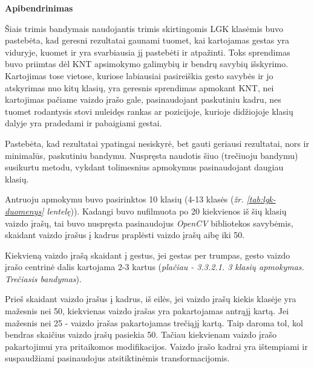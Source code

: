 \documentclass{VUMIFPSbakalaurinis}
\begin{document}
\bigbreak
\textbf{Apibendrinimas}

Šiais trimis bandymais naudojantis trimis skirtingomis LGK klasėmis buvo pastebėta, kad geresni rezultatai gaunami tuomet, kai kartojamas gestas yra viduryje, kuomet ir yra svarbiausia jį pastebėti ir atpažinti. Toks sprendimas buvo priimtas dėl KNT apsimokymo galimybių ir bendrų savybių išskyrimo. Kartojimas tose vietose, kuriose labiausiai pasireiškia gesto savybės ir jo atskyrimas nuo kitų klasių, yra geresnis sprendimas apmokant KNT, nei kartojimas pačiame vaizdo įrašo gale, pasinaudojant paskutiniu kadru, nes tuomet rodantysis stovi nuleidęs rankas ar pozicijoje, kurioje didžiojoje klasių dalyje yra pradedami ir pabaigiami gestai.

Pastebėta, kad rezultatai ypatingai nesiskyrė, bet gauti geriausi rezultatai, nors ir minimalūs, paskutiniu bandymu. Nuspręsta naudotis šiuo (trečiuoju bandymu) susikurtu metodu, vykdant tolimesnius apmokymus pasinaudojant daugiau klasių.


Antruoju apmokymu buvo pasirinktos 10 klasių (4-13 klasės (\textit{žr. \ref{tab:lgk-duomenys} lentelę})). Kadangi buvo nufilmuota po 20 kiekvienos iš šių klasių vaizdo įrašų, tai buvo nuspręsta pasinaudojus \textit{OpenCV} bibliotekos savybėmis, skaidant vaizdo įrašus į kadrus praplėsti vaizdo įrašų aibę iki 50. 

Kiekvieną vaizdo įrašą skaidant į gestus, jei gestas per trumpas, gesto vaizdo įrašo centrinė dalis kartojama 2-3 kartus (\textit{plačiau - 3.3.2.1. 3 klasių apmokymas. Trečiasis bandymas}). 

Prieš skaidant vaizdo įrašus į kadrus, iš eilės, jei vaizdo įrašų kiekis klasėje yra mažesnis nei 50, kiekvienas vaizdo įrašas yra pakartojamas antrąjį kartą. Jei mažesnis nei 25 - vaizdo įrašas pakartojamas trečiąjį kartą. Taip daroma tol, kol bendras skaičius vaizdo įrašų pasiekia 50. Tačiau kiekvienam vaizdo įrašo pakartojimui yra pritaikomos modifikacijos. Vaizdo įrašo kadrai yra ištempiami ir suspaudžiami pasinaudojus atsitiktinėmis transformacijomis.
\end{document}
